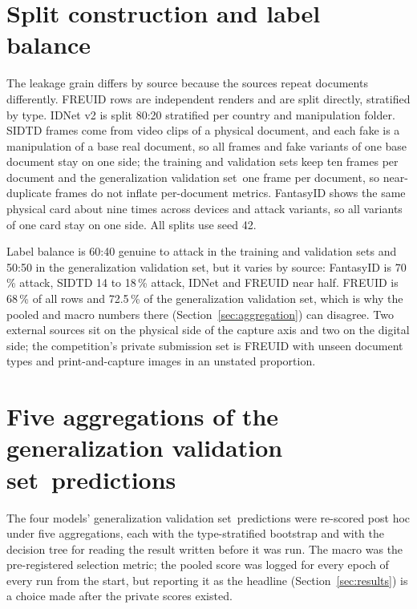 \documentclass[10pt]{article}
\newcommand{\genval}{generalization validation set}
\begin{document}
\section{Split construction and label balance}
\label{app:splits}
The leakage grain differs by source because the sources repeat documents differently. FREUID rows are independent renders and are split directly, stratified by type. IDNet v2 is split 80:20 stratified per country and manipulation folder. SIDTD frames come from video clips of a physical document, and each fake is a manipulation of a base real document, so all frames and fake variants of one base document stay on one side; the training and validation sets keep ten frames per document and the \genval\ one frame per document, so near-duplicate frames do not inflate per-document metrics. FantasyID shows the same physical card about nine times across devices and attack variants, so all variants of one card stay on one side. All splits use seed 42.

Label balance is 60:40 genuine to attack in the training and validation sets and 50:50 in the \genval, but it varies by source: FantasyID is 70\,\% attack, SIDTD 14 to 18\,\% attack, IDNet and FREUID near half. FREUID is 68\,\% of all rows and 72.5\,\% of the \genval, which is why the pooled and macro numbers there (Section~\ref{sec:aggregation}) can disagree. Two external sources sit on the physical side of the capture axis and two on the digital side; the competition's private submission set is FREUID with unseen document types and print-and-capture images in an unstated proportion.

\section{Five aggregations of the \genval\ predictions}
\label{app:aggregations}
The four models' \genval\ predictions were re-scored post hoc under five aggregations, each with the type-stratified bootstrap and with the decision tree for reading the result written before it was run. The macro was the pre-registered selection metric; the pooled score was logged for every epoch of every run from the start, but reporting it as the headline (Section~\ref{sec:results}) is a choice made after the private scores existed.
\end{document}
